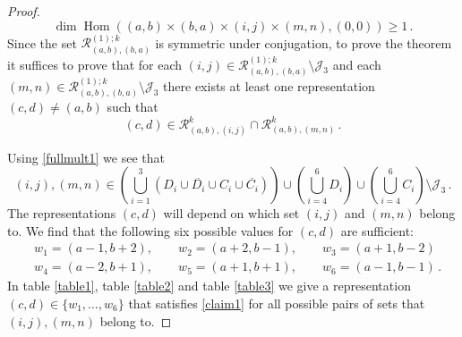 \documentclass[a4paper,11pt]{article}
\theoremstyle{plain}
\theoremstyle{definition}
\newcommand{\mycomment}[1]{}
\begin{document}
\begin{proof}
\begin{equation}
     \operatorname{dim}\operatorname{Hom}\left((a,b)\times (b,a)\times (i,j)\times (m,n),(0,0)\right) \geq 1 \, .
\end{equation}
Since the set $\mathcal{R}^{(1);k}_{(a,b),(b,a)}$ is symmetric under conjugation, to prove the theorem it suffices to prove 
that for each $(i,j)\in \mathcal{R}^{(1);k}_{(a,b),(b,a)}\setminus\mathcal{J}_3$ and each $(m,n)\in \mathcal{R}^{(1);k}_{(a,b),(b,a)}\setminus\mathcal{J}_3$
there exists at least one representation $(c,d) \ne (a,b) $
 such that
\begin{equation}\label{claim1}
(c,d)\in \mathcal{R}^k_{(a,b),(i,j)}\cap \mathcal{R}^k_{(a,b),(m,n)} \, .
\end{equation}
\mycomment{or in other words there exists $(c,d)$ such that
\begin{align}\label{claim1}
    (a,b)\times (i,j) &= (a,b) \oplus N^{(k)(c,d)}_{(a,b),(i,j)} (c,d) \oplus\cdots \qquad \text{and} \nonumber \\
    (a,b)\times (n,m) &=(a,b)\oplus N^{(k)(c,d)}_{(a,b),(n,m)} (c,d)\oplus \cdots
\end{align}
with non-zero $ N^{(k)(c,d)}_{(a,b),(i,j)}$ and $N^{(k)(c,d)}_{(a,b),(n,m)}$.} 
Using \eqref{fullmult1}  we see that 
\begin{equation}
    (i,j),(m,n)\in \left(\bigcup_{i=1}^3 \left( D_i\cup \overline{D_i}\cup C_i\cup \overline{C_i}\right) \right)\cup \left(\bigcup_{i=4}^6 D_i\right)\cup \left(\bigcup_{i=4}^6 C_i\right) \setminus\mathcal{J}_3\,.
\end{equation}
The representations  $(c,d)$ will depend on which set $(i,j)$ and $(m,n)$ belong to. 
We find that the following six possible values for $(c,d)$ are sufficient: %
\begin{align}
    & w_1=(a-1,b+2), \qquad w_2=(a+2,b-1), \qquad w_3=(a+1,b-2) \nonumber \\
    & w_4= (a-2,b+1), \qquad 
     w_5=(a+1,b+1), \qquad w_6=(a-1,b-1)\,.
\end{align}
In table \ref{table1}, table \ref{table2} and table \ref{table3} we give a representation $(c,d)\in\{w_1,\ldots,w_6\}$ that satisfies \eqref{claim1} for all possible pairs of sets that $(i,j),(m,n)$ belong to.



\end{proof}
\end{document}
